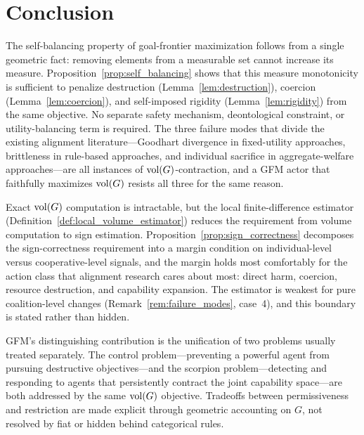%

\section{Conclusion}
\label{sec:conclusion}

The self-balancing property of goal-frontier maximization follows from a single
geometric fact: removing elements from a measurable set cannot increase its
measure. Proposition~\ref{prop:self_balancing} shows that this measure
monotonicity is sufficient to penalize destruction
(Lemma~\ref{lem:destruction}), coercion (Lemma~\ref{lem:coercion}), and
self-imposed rigidity (Lemma~\ref{lem:rigidity}) from the same objective. No
separate safety mechanism, deontological constraint, or utility-balancing term
is required. The three failure modes that divide the existing alignment
literature---Goodhart divergence in fixed-utility approaches, brittleness in
rule-based approaches, and individual sacrifice in aggregate-welfare
approaches---are all instances of $\operatorname{vol}(G)$-contraction, and a GFM actor that
faithfully maximizes $\operatorname{vol}(G)$ resists all three for the same reason.

Exact $\operatorname{vol}(G)$ computation is intractable, but the local finite-difference
estimator (Definition~\ref{def:local_volume_estimator}) reduces the requirement
from volume computation to sign estimation.
Proposition~\ref{prop:sign_correctness} decomposes the sign-correctness
requirement into a margin condition on individual-level versus
cooperative-level signals, and the margin holds most comfortably for the action
class that alignment research cares about most: direct harm, coercion, resource
destruction, and capability expansion. The estimator is weakest for pure
coalition-level changes (Remark~\ref{rem:failure_modes}, case~4), and this
boundary is stated rather than hidden.

GFM's distinguishing contribution is the unification of two problems usually
treated separately. The control problem---preventing a powerful agent from
pursuing destructive objectives---and the scorpion problem---detecting and
responding to agents that persistently contract the joint capability
space---are both addressed by the same $\operatorname{vol}(G)$ objective. Tradeoffs between
permissiveness and restriction are made explicit through geometric accounting
on $G$, not resolved by fiat or hidden behind categorical rules.

